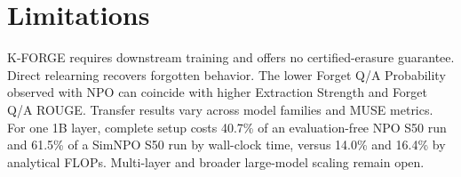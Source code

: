 \documentclass[11pt]{article}
\begin{document}
\section{Limitations}
\label{sec:limitations}

K-FORGE requires downstream training and offers no certified-erasure guarantee.
Direct relearning recovers forgotten behavior. The lower Forget Q/A Probability observed with NPO can coincide with higher Extraction Strength and Forget Q/A ROUGE.
Transfer results vary across model families and MUSE metrics. For one 1B layer, complete setup costs 40.7\% of an evaluation-free NPO S50 run and 61.5\% of a SimNPO S50 run by wall-clock time, versus 14.0\% and 16.4\% by analytical FLOPs. Multi-layer and broader large-model scaling remain open.

%

\onecolumn
\end{document}
